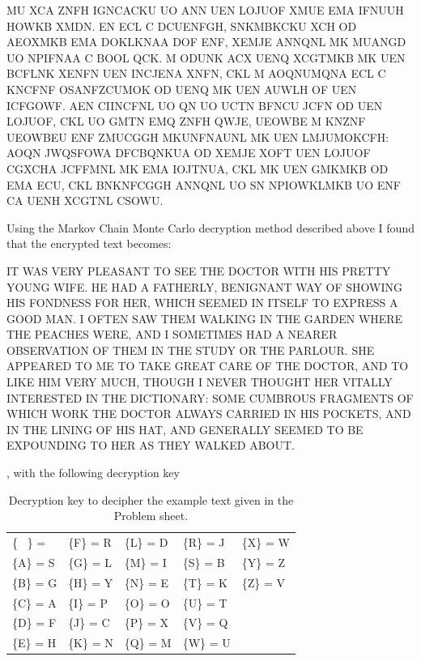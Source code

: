 \documentclass[a4paper, 11pt]{article}
\begin{document}
\begin{adjustwidth}{2.5em}{0pt}
  \small
  MU XCA ZNFH IGNCACKU UO ANN UEN LOJUOF XMUE EMA IFNUUH
  HOWKB XMDN. EN ECL C DCUENFGH, SNKMBKCKU XCH OD AEOXMKB
  EMA DOKLKNAA DOF ENF, XEMJE ANNQNL MK MUANGD UO NPIFNAA 
  C BOOL QCK. M ODUNK ACX UENQ XCGTMKB MK UEN BCFLNK
  XENFN UEN INCJENA XNFN, CKL M AOQNUMQNA ECL C KNCFNF
  OSANFZCUMOK OD UENQ MK UEN AUWLH OF UEN ICFGOWF. AEN
  CIINCFNL UO QN UO UCTN BFNCU JCFN OD UEN LOJUOF, CKL UO
  GMTN EMQ ZNFH QWJE, UEOWBE M KNZNF UEOWBEU ENF ZMUCGGH
  MKUNFNAUNL MK UEN LMJUMOKCFH: AOQN JWQSFOWA DFCBQNKUA
  OD XEMJE XOFT UEN LOJUOF CGXCHA JCFFMNL MK EMA IOJTNUA,
  CKL MK UEN GMKMKB OD EMA ECU, CKL BNKNFCGGH ANNQNL UO
  SN NPIOWKLMKB UO ENF CA UENH XCGTNL CSOWU.
\end{adjustwidth}

Using the Markov Chain Monte Carlo decryption method described above I found 
that the encrypted text becomes:

\begin{adjustwidth}{2.5em}{0pt}
  \small
  IT WAS VERY PLEASANT TO SEE THE DOCTOR WITH HIS PRETTY
  YOUNG WIFE. HE HAD A FATHERLY, BENIGNANT WAY OF SHOWING
  HIS FONDNESS FOR HER, WHICH SEEMED IN ITSELF TO EXPRESS 
  A GOOD MAN. I OFTEN SAW THEM WALKING IN THE GARDEN
  WHERE THE PEACHES WERE, AND I SOMETIMES HAD A NEARER
  OBSERVATION OF THEM IN THE STUDY OR THE PARLOUR. SHE
  APPEARED TO ME TO TAKE GREAT CARE OF THE DOCTOR, AND TO
  LIKE HIM VERY MUCH, THOUGH I NEVER THOUGHT HER VITALLY
  INTERESTED IN THE DICTIONARY: SOME CUMBROUS FRAGMENTS
  OF WHICH WORK THE DOCTOR ALWAYS CARRIED IN HIS POCKETS,
  AND IN THE LINING OF HIS HAT, AND GENERALLY SEEMED TO
  BE EXPOUNDING TO HER AS THEY WALKED ABOUT.
\end{adjustwidth}

, with the following decryption key

\begin{table}[h]
  \centering
  \caption{Decryption key to decipher the example text given in the
  Problem sheet.}
  \begin{tabular}{l l l l l}
\{ \ \} =    &  \{F\} = R  &  \{L\} = D  &  \{R\} = J  &  \{X\} = W  \\
\{A\} = S  &  \{G\} = L  &  \{M\} = I  &  \{S\} = B  &  \{Y\} = Z  \\
\{B\} = G  &  \{H\} = Y  &  \{N\} = E  &  \{T\} = K  &  \{Z\} = V  \\
\{C\} = A  &  \{I\} = P  &  \{O\} = O  &  \{U\} = T  &  \ \\
\{D\} = F  &  \{J\} = C  &  \{P\} = X  &  \{V\} = Q  &  \ \\
\{E\} = H  &  \{K\} = N  &  \{Q\} = M  &  \{W\} = U  &  \ \\
  \end{tabular}
  \label{tab:ExampleKey}
\end{table}
\end{document}
